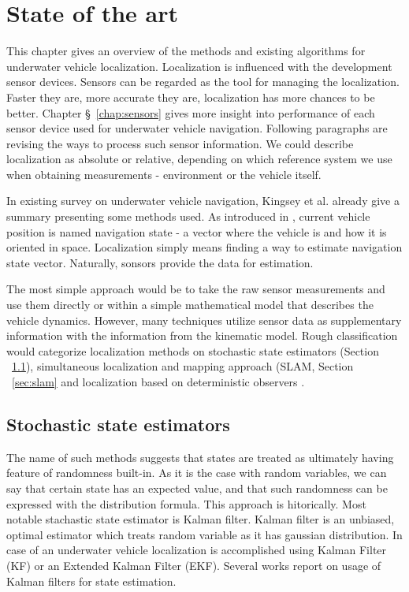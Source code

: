 \chapter{State of the art} \label{chap:state-of-the-art}

This chapter gives an overview of the methods and existing algorithms for underwater vehicle localization. Localization is influenced with the development sensor devices. Sensors can be regarded as the tool for managing the localization. Faster they are, more accurate they are, localization has more chances to be better. Chapter \S~\ref{chap:sensors} gives more insight into performance of each sensor device used for underwater vehicle navigation. Following paragraphs are revising the ways to process such sensor information. We could describe localization as absolute or relative, depending on which reference system we use when obtaining measurements - environment or the vehicle itself. 

In existing survey on underwater vehicle navigation, Kingsey et al. \cite{kinsey06} already give a summary presenting some methods used. As introduced in \cite{kinsey06}, current vehicle position is named navigation state - a vector where the vehicle is and how it is oriented in space. Localization simply means finding a way to estimate navigation state vector. Naturally, sonsors provide the data for estimation.

The most simple approach would be to take the raw sensor measurements and use them directly or within a simple mathematical model that describes the vehicle dynamics. However, many techniques utilize sensor data as supplementary information with the information from the kinematic model. Rough classification would categorize localization methods on stochastic state estimators (Section ~\ref{sec:stochastic-methods}), simultaneous localization and mapping approach (SLAM, Section ~\ref{sec:slam} and localization based on deterministic observers \cite{kinsey06}.

\section{Stochastic state estimators} \label{sec:stochastic-methods}
The name of such methods suggests that states are treated as ultimately having feature of randomness built-in. As it is the case with random variables, we can say that certain state has an expected value, and that such randomness can be expressed with the distribution formula. This approach is hitorically. Most notable stachastic state estimator is Kalman filter. Kalman filter is an unbiased, optimal estimator which treats random variable as it has gaussian distribution. In case of an underwater vehicle localization is accomplished using Kalman Filter (KF) or an Extended Kalman Filter (EKF). Several works report on usage of Kalman filters for state estimation. 

